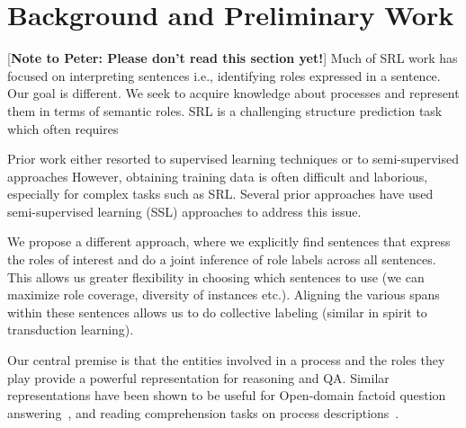  




\section{Background and Preliminary Work}
[{\bf Note to Peter: Please don't read this section yet!}]
Much of SRL work has focused on interpreting sentences i.e., identifying roles expressed in a sentence.
Our goal is different. 
We seek to acquire knowledge about processes and represent them in terms of semantic roles.
SRL is a challenging structure prediction task which often requires 

Prior work either resorted to supervised learning techniques or to semi-supervised approaches 
However, obtaining training data is often difficult and laborious, especially for complex tasks such as SRL.
Several prior approaches have used semi-supervised learning (SSL) approaches to address this issue. 

We propose a different approach, where we explicitly find sentences that express the roles of interest and do a joint inference of role labels across all sentences. 
This allows us greater flexibility in choosing which sentences to use (we can maximize role coverage, diversity of instances etc.).
Aligning the various spans within these sentences allows us to do collective labeling (similar in spirit to transduction learning).


Our central premise is that the entities involved in a process and the roles they play provide a powerful representation for reasoning and QA. 
Similar representations have been shown to be useful for Open-domain factoid question answering~\cite{shen2007using,pizzato2008indexing}, 
and reading comprehension tasks on process descriptions~\cite{berantSrikumar14}.


